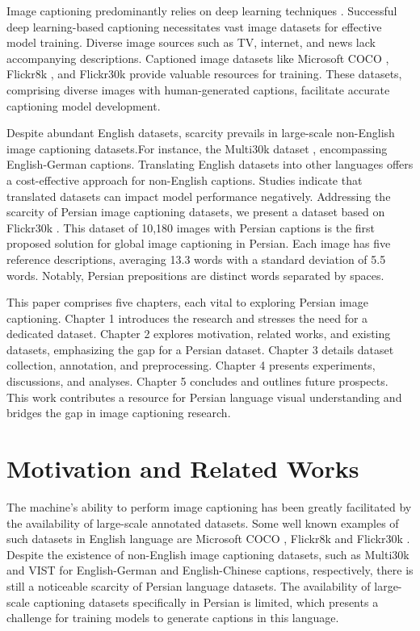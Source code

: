 \documentclass[runningheads]{llncs}
\begin{document}
Image captioning predominantly relies on deep learning techniques \cite{Karpathy2015,Vinyals2015,Xu2015,Luo2023}. Successful deep learning-based captioning necessitates vast image datasets for effective model training. Diverse image sources such as TV, internet, and news lack accompanying descriptions. Captioned image datasets like Microsoft COCO \cite{MSCOCO}, Flickr8k \cite{Flickr8k}, and Flickr30k \cite{Flickr30k} provide valuable resources for training. These datasets, comprising diverse images with human-generated captions, facilitate accurate captioning model development.

Despite abundant English datasets, scarcity prevails in large-scale non-English image captioning datasets.For instance, the Multi30k dataset \cite{Multi30k}, encompassing English-German captions. Translating English datasets into other languages offers a cost-effective approach for non-English captions. Studies \cite{Xue,Zoph,Rosa} indicate that translated datasets can impact model performance negatively. Addressing the scarcity of Persian image captioning datasets, we present a dataset based on Flickr30k \cite{Flickr30k}. This dataset of 10,180 images with Persian captions is the first proposed solution for global image captioning in Persian. Each image has five reference descriptions, averaging 13.3 words with a standard deviation of 5.5 words. Notably, Persian prepositions are distinct words separated by spaces.

This paper comprises five chapters, each vital to exploring Persian image captioning. Chapter 1 introduces the research and stresses the need for a dedicated dataset. Chapter 2 explores motivation, related works, and existing datasets, emphasizing the gap for a Persian dataset. Chapter 3 details dataset collection, annotation, and preprocessing. Chapter 4 presents experiments, discussions, and analyses. Chapter 5 concludes and outlines future prospects. This work contributes a resource for Persian language visual understanding and bridges the gap in image captioning research.

\section{Motivation and Related Works}
The machine's ability to perform image captioning has been greatly facilitated by the availability of large-scale annotated datasets. Some well known examples of such datasets in English language are Microsoft COCO \cite{MSCOCO}, Flickr8k \cite{Flickr8k} and Flickr30k \cite{Flickr30k}. Despite the existence of non-English image captioning datasets, such as Multi30k \cite{Multi30k} and VIST \cite{VIST} for English-German and English-Chinese captions, respectively, there is still a noticeable scarcity of Persian language datasets. The availability of large-scale captioning datasets specifically in Persian is limited, which presents a challenge for training models to generate captions in this language.
\end{document}
